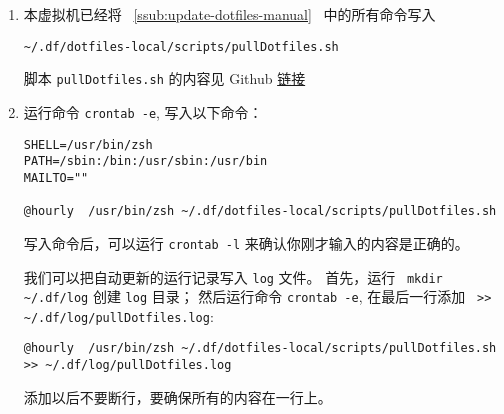 \documentclass[
    11pt,
    cite=authoryear,
    device=normal,
    lang=cn,
    mode=simple,
    result=answer,
    toc=onecol,
]{elegantbook_sierxue}
\begin{document}
\begin{enumerate}
    \item 本虚拟机已经将 ~\ref{ssub:update-dotfiles-manual}~ 中的所有命令写入
\begin{lstlisting}[escapeinside=``]
~/.df/dotfiles-local/scripts/pullDotfiles.sh
\end{lstlisting}
        脚本 \lstinline{pullDotfiles.sh} 的内容见 Github
        \href{https://github.com/ddpom/scripts/blob/master/pullDotfiles.sh}
        {链接}
    \item 运行命令 \lstinline{crontab -e}, 写入以下命令：
\begin{lstlisting}[escapeinside=``]
SHELL=/usr/bin/zsh
PATH=/sbin:/bin:/usr/sbin:/usr/bin
MAILTO=""

@hourly  /usr/bin/zsh ~/.df/dotfiles-local/scripts/pullDotfiles.sh
\end{lstlisting}
写入命令后，可以运行 \lstinline{crontab -l}
来确认你刚才输入的内容是正确的。
\begin{share}\label{note:crontab}
    我们可以把自动更新的运行记录写入 \lstinline{log} 文件。
    首先，运行~ \lstinline{mkdir ~/.df/log} 创建 \lstinline{log} 目录；
    然后运行命令 \lstinline{crontab -e}, 在最后一行添加
    \lstinline{ >> ~/.df/log/pullDotfiles.log}:
\begin{lstlisting}[escapeinside=``]
@hourly  /usr/bin/zsh ~/.df/dotfiles-local/scripts/pullDotfiles.sh >> ~/.df/log/pullDotfiles.log
\end{lstlisting}
添加以后不要断行，要确保所有的内容在一行上。
\end{share}
\end{enumerate}

%
\end{document}
